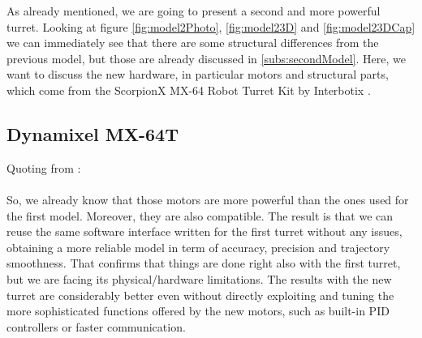 As already mentioned, we are going to present a second and more powerful turret. Looking at figure \ref{fig:model2Photo}, \ref{fig:model23D} and \ref{fig:model23DCap} we can immediately see that there are some structural differences from the previous model, but those are already discussed in \ref{subs:secondModel}. Here, we want to discuss the new hardware, in particular motors and structural parts, which come from the ScorpionX MX-64 Robot Turret Kit by Interbotix \cite{MX64Turret}.
\subsection{Dynamixel MX-64T}
Quoting from \cite{web-MX64}:\\
\\
So, we already know that those motors are more powerful than the ones used for the first model. Moreover, they are also compatible. The result is that we can reuse the same software interface written for the first turret without any issues, obtaining a more reliable model in term of accuracy, precision and trajectory smoothness. That confirms that things are done right also with the first turret, but we are facing its physical/hardware limitations. The results with the new turret are considerably better even without directly exploiting and tuning the more sophisticated functions offered by the new motors, such as built-in PID controllers or faster communication.
